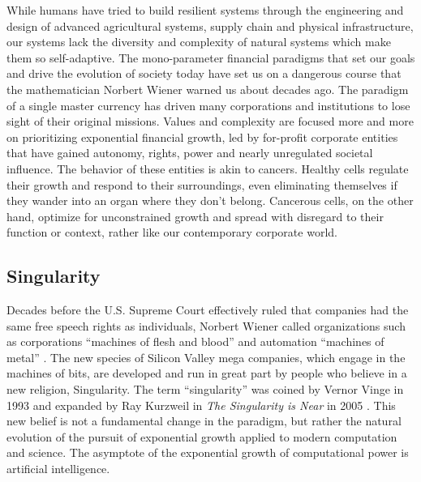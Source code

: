 While humans have tried to build resilient systems through the engineering and design of advanced agricultural systems, supply chain and physical infrastructure, our systems lack the diversity and complexity of natural systems which make them so self-adaptive. The mono-parameter financial paradigms that set our goals and drive the evolution of society today have set us on a dangerous course that  the mathematician Norbert Wiener warned us about decades ago. The paradigm of a single master currency has driven many corporations and institutions to lose sight of their original missions. Values and complexity are focused more and more on prioritizing exponential financial growth, led by for-profit corporate entities that have gained autonomy, rights, power and nearly unregulated societal influence. The behavior of these entities is akin to cancers. Healthy cells regulate their growth and respond to their surroundings, even eliminating themselves if they wander into an organ where they don't belong. Cancerous cells, on the other hand, optimize for unconstrained growth and spread with disregard to their function or context, rather like our contemporary corporate world.

\subsection{Singularity}

Decades before the U.S. Supreme Court effectively ruled that companies had the same free speech rights as individuals, Norbert Wiener called organizations such as corporations ``machines of flesh and blood'' and automation ``machines of metal'' \cite{wiener1988human}. The new species of Silicon Valley mega companies, which engage in the machines of bits, are developed and run in great part by people who believe in a new religion, Singularity. The term ``singularity'' was coined by Vernor Vinge in 1993 \cite{vinge1993coming} and expanded by Ray Kurzweil in \textit{The Singularity is Near} in 2005 \cite{kurzweil2005singularity}. This new belief is not a fundamental change in the paradigm, but rather the natural evolution of the pursuit of exponential growth applied to modern computation and science. The asymptote of the exponential growth of computational power is artificial intelligence.

